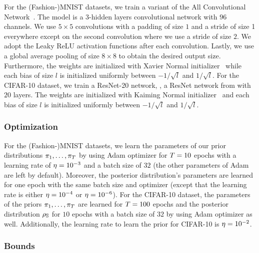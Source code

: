 For the (Fashion-)MNIST datasets, we train a variant of the All Convolutional  Network~\citep{SpringenbergDosovitskiyBroxRiedmiller2014}.
The model is a $3$-hidden layers convolutional network with $96$ channels.
We use $5\times 5$ convolutions  with a padding of size $1$ and a stride of size 1 everywhere except on the second convolution where we use a stride of size $2$.
We adopt the Leaky ReLU activation functions after each convolution. Lastly, we use a global average pooling of size $8\times 8$ to obtain the desired output size. 
Furthermore, the weights are initialized with Xavier Normal initializer~\citep{GlorotBengio2010} while each bias of size $l$ is initialized uniformly between $-1/{\sqrt{l}}$ and $1/\sqrt{l}$.
For the CIFAR-10 dataset, we train a ResNet-20 network, \ie, a ResNet network from \citet{HeZhangRenSun2016} with $20$ layers.
The weights are initialized with Kaiming Normal initializer~\citep{HeZhangRenSun2015} and each bias of size $l$ is initialized uniformly between $-1/{\sqrt{l}}$ and $1/\sqrt{l}$.


\subsubsection{Optimization}

For the (Fashion-)MNIST datasets, we learn the parameters of our prior distributions $\pi_1,\dots,\pi_T$ by using Adam optimizer for $T=10$ epochs with a learning rate of $\eta=10^{-3}$ and a batch size of $32$ (the other parameters of Adam are left by default).
Moreover, the posterior distribution's parameters are learned for one epoch with the same batch size and optimizer (except that the learning rate is either $\eta=10^{-4}$ or $\eta=10^{-6}$).
For the CIFAR-10 dataset, the parameters of the priors $\pi_1,\dots,\pi_T$ are learned for $T=100$ epochs and the posterior distribution $\rho_{\mathbb{S}}$ for $10$ epochs with a batch size of $32$ by using Adam optimizer as well. 
Additionally, the learning rate to learn the prior for CIFAR-10 is $\eta=10^{-2}$.

\subsubsection{Bounds}

